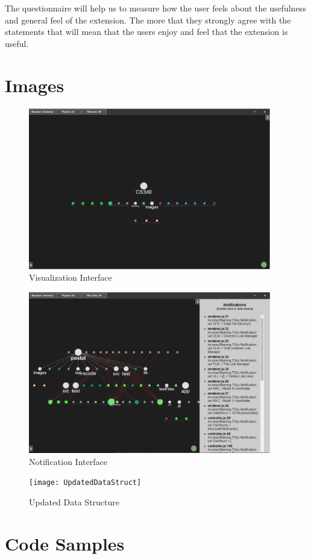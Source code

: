 \documentclass[letterpaper,10pt,titlepage,draftclsnofoot,onecolumn,onesided] {IEEEtran}
\begin{document}
	The questionnaire will help us to measure how the user feels about the usefulness and general feel of the extension. 
	The more that they strongly agree with the statements that will mean that the users enjoy and feel that the extension is useful.

\pagebreak	
\section{Images}
	\begin{figure}[H]
		\includegraphics[width=400px]{PostalUI}
		\caption{Visualization Interface}  
	\end{figure}
	
	\begin{figure}[H]
		\includegraphics[width=400px]{PostalNotification}
		\caption{Notification Interface}  
	\end{figure}
	
	\begin{figure}[H]
		\texttt{[image: UpdatedDataStruct]}
		\caption{Updated Data Structure}
	\end{figure}

\pagebreak
\section{Code Samples}
\end{document}

